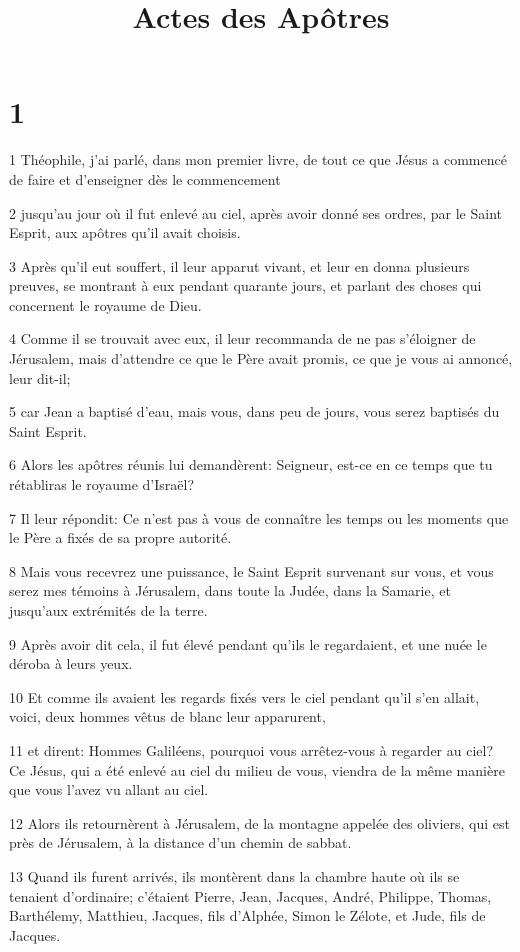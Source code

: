 

\title{Actes des Apôtres}


\chapter{1}

\par 1 Théophile, j'ai parlé, dans mon premier livre, de tout ce que Jésus a commencé de faire et d'enseigner dès le commencement
\par 2 jusqu'au jour où il fut enlevé au ciel, après avoir donné ses ordres, par le Saint Esprit, aux apôtres qu'il avait choisis.
\par 3 Après qu'il eut souffert, il leur apparut vivant, et leur en donna plusieurs preuves, se montrant à eux pendant quarante jours, et parlant des choses qui concernent le royaume de Dieu.
\par 4 Comme il se trouvait avec eux, il leur recommanda de ne pas s'éloigner de Jérusalem, mais d'attendre ce que le Père avait promis, ce que je vous ai annoncé, leur dit-il;
\par 5 car Jean a baptisé d'eau, mais vous, dans peu de jours, vous serez baptisés du Saint Esprit.
\par 6 Alors les apôtres réunis lui demandèrent: Seigneur, est-ce en ce temps que tu rétabliras le royaume d'Israël?
\par 7 Il leur répondit: Ce n'est pas à vous de connaître les temps ou les moments que le Père a fixés de sa propre autorité.
\par 8 Mais vous recevrez une puissance, le Saint Esprit survenant sur vous, et vous serez mes témoins à Jérusalem, dans toute la Judée, dans la Samarie, et jusqu'aux extrémités de la terre.
\par 9 Après avoir dit cela, il fut élevé pendant qu'ils le regardaient, et une nuée le déroba à leurs yeux.
\par 10 Et comme ils avaient les regards fixés vers le ciel pendant qu'il s'en allait, voici, deux hommes vêtus de blanc leur apparurent,
\par 11 et dirent: Hommes Galiléens, pourquoi vous arrêtez-vous à regarder au ciel? Ce Jésus, qui a été enlevé au ciel du milieu de vous, viendra de la même manière que vous l'avez vu allant au ciel.
\par 12 Alors ils retournèrent à Jérusalem, de la montagne appelée des oliviers, qui est près de Jérusalem, à la distance d'un chemin de sabbat.
\par 13 Quand ils furent arrivés, ils montèrent dans la chambre haute où ils se tenaient d'ordinaire; c'étaient Pierre, Jean, Jacques, André, Philippe, Thomas, Barthélemy, Matthieu, Jacques, fils d'Alphée, Simon le Zélote, et Jude, fils de Jacques.
